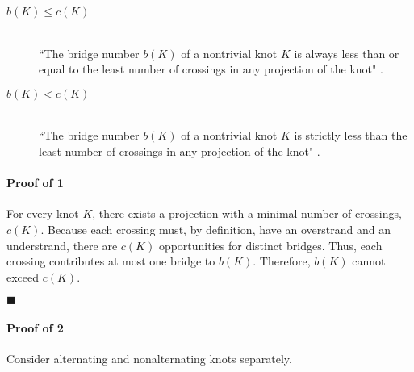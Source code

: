 \documentclass[titlepage,11pt]{article}
\newcommand{\dq}[4][]{``#2"#1 \cite[#4]{#3}.}
\newcommand{\qed}{
    \begin{flushright}
        $\blacksquare$
    \end{flushright}
}
\begin{document}
\begin{theor}
    \begin{description}
        \item[$b(K)\leq c(K)$] \hfill \\ \dq{The bridge number $b(K)$ of a nontrivial knot $K$ is always less than or equal to the least number of crossings in any projection of the knot}{bib:knotbook}{65}
        \item[$b(K)<c(K)$] \hfill \\ \dq{The bridge number $b(K)$ of a nontrivial knot $K$ is strictly less than the least number of crossings in any projection of the knot}{bib:knotbook}{65}
    \end{description}
\end{theor}

\paragraph{\textbf{Proof of 1}} For every knot $K$, there exists a projection with a minimal number of crossings, $c(K)$. Because each crossing must, by definition, have an overstrand and an understrand, there are $c(K)$ opportunities for distinct bridges. Thus, each crossing contributes at most one bridge to $b(K)$. Therefore, $b(K)$ cannot exceed $c(K)$.
\qed
\newpage
\paragraph{\textbf{Proof of 2}} Consider alternating and nonalternating knots separately.
\end{document}
